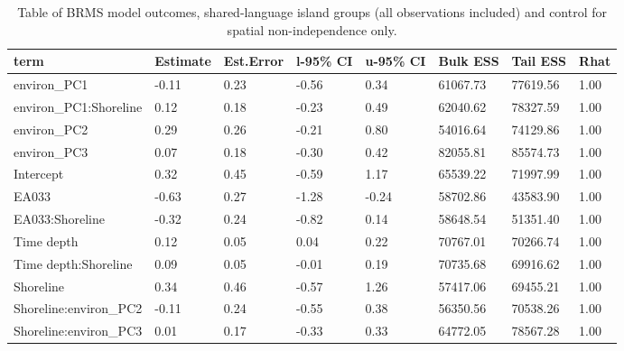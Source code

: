 \begin{table}[ht]
\centering
\begin{tabular}{p{3cm}p{1.35cm}p{1.35cm}p{1.35cm}p{1.35cm}p{1.35cm}p{1.35cm}p{1.35cm}}
  \toprule
term & Estimate & Est.Error & l-95\% CI & u-95\% CI & Bulk ESS & Tail ESS & Rhat \\ 
  \midrule
environ\_PC1 & -0.11 & 0.23 & -0.56 & 0.34 & 61067.73 & 77619.56 & 1.00 \\ 
  environ\_PC1:Shoreline & 0.12 & 0.18 & -0.23 & 0.49 & 62040.62 & 78327.59 & 1.00 \\ 
  environ\_PC2 & 0.29 & 0.26 & -0.21 & 0.80 & 54016.64 & 74129.86 & 1.00 \\ 
  environ\_PC3 & 0.07 & 0.18 & -0.30 & 0.42 & 82055.81 & 85574.73 & 1.00 \\ 
  Intercept & 0.32 & 0.45 & -0.59 & 1.17 & 65539.22 & 71997.99 & 1.00 \\ 
  EA033 & -0.63 & 0.27 & -1.28 & -0.24 & 58702.86 & 43583.90 & 1.00 \\ 
  EA033:Shoreline & -0.32 & 0.24 & -0.82 & 0.14 & 58648.54 & 51351.40 & 1.00 \\ 
  Time depth & 0.12 & 0.05 & 0.04 & 0.22 & 70767.01 & 70266.74 & 1.00 \\ 
  Time depth:Shoreline & 0.09 & 0.05 & -0.01 & 0.19 & 70735.68 & 69916.62 & 1.00 \\ 
  Shoreline & 0.34 & 0.46 & -0.57 & 1.26 & 57417.06 & 69455.21 & 1.00 \\ 
  Shoreline:environ\_PC2 & -0.11 & 0.24 & -0.55 & 0.38 & 56350.56 & 70538.26 & 1.00 \\ 
  Shoreline:environ\_PC3 & 0.01 & 0.17 & -0.33 & 0.33 & 64772.05 & 78567.28 & 1.00 \\ 
   \bottomrule
\end{tabular}
\caption{Table of BRMS model outcomes, shared-language island groups (all observations included) and control for spatial non-independence only.} 
\label{BRMS_effects_medium_control_spatial}
\end{table}
